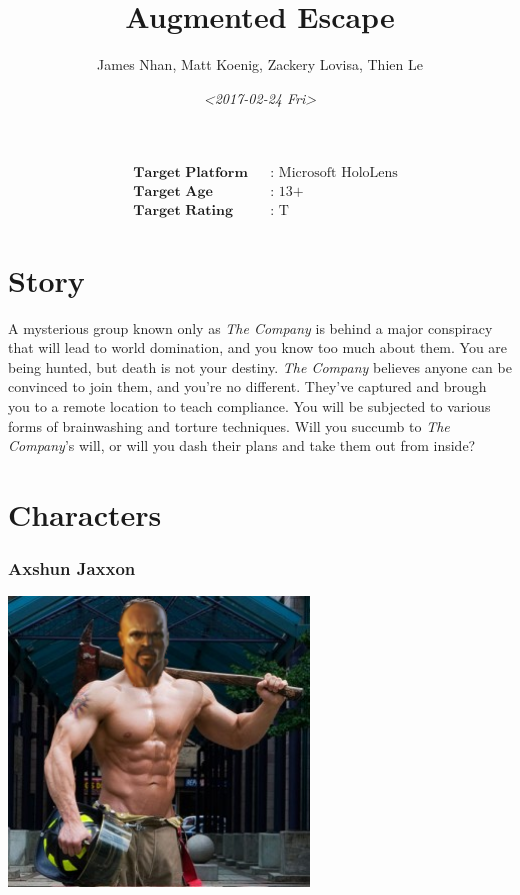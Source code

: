 \documentclass[12pt]{article}
\author{James Nhan, Matt Koenig, Zackery Lovisa, Thien Le}
\date{\textit{<2017-02-24 Fri>}}
\title{Augmented Escape}
\begin{document}
\maketitle
\begin{align*}
   &\textbf{Target Platform}&&\text{: Microsoft HoloLens} \\
   &\textbf{Target Age}&&\text{: 13+} \\
   &\textbf{Target Rating}&&\text{: T}
\end{align*}

\pagebreak

\tableofcontents

\pagebreak

\section{Story}
\label{sec:org29fb24c}
A mysterious group known only as \emph{The Company} is behind a major conspiracy that will lead to world domination, and you know too much about them. You are being hunted, but death is not your destiny. \emph{The Company} believes anyone can be convinced to join them, and you're no different. They've captured and brough you to a remote location to teach compliance. You will be subjected to various forms of brainwashing and torture techniques. Will you succumb to \emph{The Company}'s will, or will you dash their plans and take them out from inside?

\section{Characters}
\label{sec:org43cc283}
\subsubsection{Axshun Jaxxon}
\label{sec:org4630ebe}
\begin{center}
\includegraphics[width=8cm]{./img/axshun-jaxxon.png}
\end{center}
\end{document}
